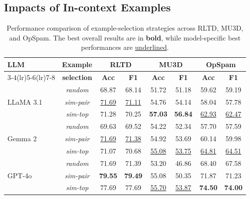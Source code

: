 \subsection{Impacts of In-context Examples}
\begin{table}
\centering
\small  %
\begin{tabular}{l c cc cc cc}
\toprule
\textbf{LLM} 
  & \textbf{Example}
  & \multicolumn{2}{c}{\textbf{RLTD}}
  & \multicolumn{2}{c}{\textbf{MU3D}}
  & \multicolumn{2}{c}{\textbf{OpSpam}} \\
\cmidrule(lr){3-4}\cmidrule(lr){5-6}\cmidrule(lr){7-8}
 & \textbf{selection}
 & \textbf{Acc} & \textbf{F1}
 & \textbf{Acc} & \textbf{F1}
 & \textbf{Acc} & \textbf{F1} \\
\midrule

\multirow{3}{*}{LLaMA 3.1} 
  & \textit{random}     & 68.87 & 68.14 & 51.72 & 51.18 & 59.62 & 59.19 \\
  & \textit{sim-pair} & \underline{71.69} & \underline{71.11} & 54.76 & 54.14 & 58.04 & 57.78 \\
  & \textit{sim-top}   & 71.28 & 70.25 & \textbf{57.03} & \textbf{56.84} & \underline{62.93} & \underline{62.47} \\
\midrule

\multirow{3}{*}{Gemma 2} 
  & \textit{random}    & 69.63 & 69.52 & 54.22 & 52.34 & 57.70 & 57.59 \\
  & \textit{sim-pair} & \underline{71.69} & \underline{71.38} & 54.92 & 53.69 & 60.14 & 59.98 \\
  & \textit{sim-top}   & 71.07 & 70.68 & \underline{55.08} & \underline{53.75} & \underline{64.81} & \underline{64.51} \\
\midrule

\multirow{3}{*}{GPT-4o} 
  & \textit{random}    & 71.69 & 71.39 & 53.20 & 46.86 & 68.40 & 67.58 \\
  & \textit{sim-pair} & \textbf{79.55} & \textbf{79.49} & 55.08 & 50.35 & 71.87 & 71.23 \\
  & \textit{sim-top}   & 77.69 & 77.69 & \underline{55.70} & \underline{53.87} & \textbf{74.50} & \textbf{74.00} \\
\bottomrule
\end{tabular}
\caption{Performance comparison of example-selection strategies across RLTD, MU3D, and OpSpam. The best overall results are in \textbf{bold}, while model-specific best performances are \underline{underlined}.}
\label{tab:example_selection}
\end{table}




